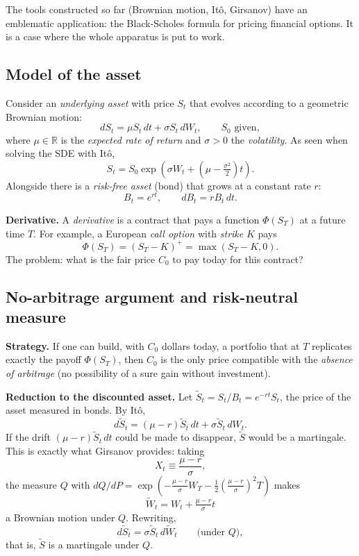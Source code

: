 \documentclass[11pt, a4paper]{article}
\begin{document}
The tools constructed so far (Brownian motion, Itô, Girsanov) have an emblematic
application: the Black-Scholes formula for pricing financial options. It is a case where
the whole apparatus is put to work.

\subsection{Model of the asset}

Consider an \emph{underlying asset} with price $S_t$ that evolves according to a geometric
Brownian motion:
$$ dS_t = \mu S_t \, dt + \sigma S_t \, dW_t, \qquad S_0 \text{ given}, $$
where $\mu \in \mathbb{R}$ is the \emph{expected rate of return} and $\sigma > 0$ the
\emph{volatility}. As seen when solving the SDE with Itô,
$$ S_t = S_0 \exp\!\left(\sigma W_t + \left(\mu - \tfrac{\sigma^2}{2}\right) t\right). $$
Alongside there is a \emph{risk-free asset} (bond) that grows at a constant rate $r$:
$$ B_t = e^{rt}, \qquad dB_t = r B_t \, dt. $$

\textbf{Derivative.} A \emph{derivative} is a contract that pays a function $\Phi(S_T)$ at a
future time $T$. For example, a European \emph{call option} with \emph{strike} $K$ pays
$$ \Phi(S_T) = (S_T - K)^+ = \max(S_T - K, 0). $$
The problem: what is the fair price $C_0$ to pay today for this contract?

\subsection{No-arbitrage argument and risk-neutral measure}

\textbf{Strategy.} If one can build, with $C_0$ dollars today, a portfolio that at $T$
replicates exactly the payoff $\Phi(S_T)$, then $C_0$ is the only price compatible with the
\emph{absence of arbitrage} (no possibility of a sure gain without investment).

\textbf{Reduction to the discounted asset.} Let $\widetilde{S}_t = S_t / B_t = e^{-rt} S_t$, the price
of the asset measured in bonds. By Itô,
$$ d\widetilde{S}_t = (\mu - r) \widetilde{S}_t \, dt + \sigma \widetilde{S}_t \, dW_t. $$
If the drift $(\mu - r) \widetilde{S}_t \, dt$ could be made to disappear, $\widetilde{S}$
would be a
martingale. This is exactly what Girsanov provides: taking
$$ X_t \equiv \frac{\mu - r}{\sigma}, $$
the measure $Q$ with $dQ/dP = \exp(-\tfrac{\mu - r}{\sigma} W_T - \tfrac{1}{2}(\tfrac{\mu-r}{\sigma})^2
T)$
makes
$$ \widetilde{W}_t = W_t + \tfrac{\mu - r}{\sigma} t $$
a Brownian motion under $Q$. Rewriting,
$$ d\widetilde{S}_t = \sigma \widetilde{S}_t \, d\widetilde{W}_t \qquad \text{(under $Q$)}, $$
that is, $\widetilde{S}$ is a martingale under $Q$.
\end{document}
